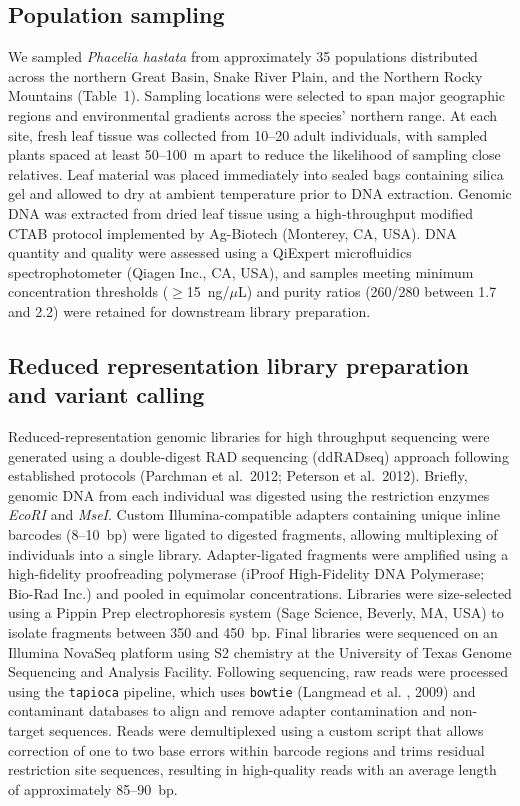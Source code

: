 \documentclass[letterpaper, 12pt]{article}
\begin{document}
\subsection*{Population sampling}

We sampled \emph{Phacelia hastata} from approximately 35 populations distributed across the northern Great Basin, Snake River Plain, and the Northern Rocky Mountains (Table~1). Sampling locations were selected to span major geographic regions and environmental gradients across the species' northern range. At each site, fresh leaf tissue was collected from 10--20 adult individuals, with sampled plants spaced at least 50--100~m apart to reduce the likelihood of sampling close relatives. Leaf material was placed immediately into sealed bags containing silica gel and allowed to dry at ambient temperature prior to DNA extraction. Genomic DNA was extracted from dried leaf tissue using a high-throughput modified CTAB protocol implemented by Ag-Biotech (Monterey, CA, USA). DNA quantity and quality were assessed using a QiExpert microfluidics spectrophotometer (Qiagen Inc., CA, USA), and samples meeting minimum concentration thresholds ($\geq$15~ng/$\mu$L) and purity ratios (260/280 between 1.7 and 2.2) were retained for downstream library preparation.

\subsection*{Reduced representation library preparation and variant calling}

Reduced-representation genomic libraries for high throughput sequencing were generated using a double-digest RAD sequencing (ddRADseq) approach following established protocols (Parchman et al.\ 2012; Peterson et al.\ 2012). Briefly, genomic DNA from each individual was digested using the restriction enzymes \emph{EcoRI} and \emph{MseI}. Custom Illumina-compatible adapters containing unique inline barcodes (8--10~bp) were ligated to digested fragments, allowing multiplexing of individuals into a single library. Adapter-ligated fragments were amplified using a high-fidelity proofreading polymerase (iProof High-Fidelity DNA Polymerase; Bio-Rad Inc.) and pooled in equimolar concentrations. Libraries were size-selected using a Pippin Prep electrophoresis system (Sage Science, Beverly, MA, USA) to isolate fragments between 350 and 450~bp. Final libraries were sequenced on an Illumina NovaSeq platform using S2 chemistry at the University of Texas Genome Sequencing and Analysis Facility. Following sequencing, raw reads were processed using the \texttt{tapioca} pipeline, which uses \texttt{bowtie} (Langmead et al. , 2009) and contaminant databases to align and remove adapter contamination and non-target sequences. Reads were demultiplexed using a custom script that allows correction of one to two base errors within barcode regions and trims residual restriction site sequences, resulting in high-quality reads with an average length of approximately 85--90~bp.
\end{document}
